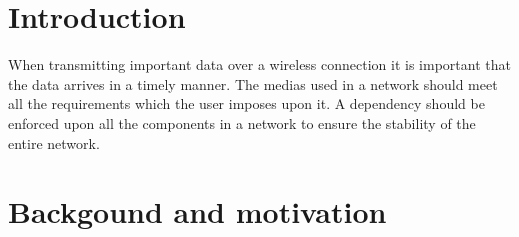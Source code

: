 \documentclass[a4paper]{article}
\begin{document}
\section{Introduction}




When transmitting important data over a wireless connection it is important that
the data arrives in a timely manner. The medias used in a network should meet
all the requirements which the user imposes upon it. A dependency should be
enforced upon all the components in a network to ensure the stability of the
entire network.




\section{Backgound and motivation}


\end{document}
